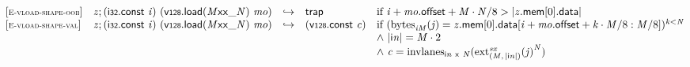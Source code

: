 \vspace{1ex}

$$
\begin{array}{@{}l@{}lcl@{}l@{}}
{[\textsc{\scriptsize E{-}vload{-}shape{-}oob}]} \quad & {\mathit{z}} ; (\mathsf{i{\scriptstyle32}}.\mathsf{const}~{\mathit{i}})~({\mathsf{v{\scriptstyle128}.load}}{({{{{{\mathit{M}}}{\mathsf{x}}}{\mathsf{x}}}{\mathsf{\_}}}{{\mathit{N}}})}~{\mathit{mo}}) &\hookrightarrow& \mathsf{trap} &\quad
  \mbox{if}~{\mathit{i}} + {\mathit{mo}}.\mathsf{offset} + {\mathit{M}} \cdot {\mathit{N}} / 8 > {|{{\mathit{z}}.\mathsf{mem}}{{}[0]}.\mathsf{data}|} \\
{[\textsc{\scriptsize E{-}vload{-}shape{-}val}]} \quad & {\mathit{z}} ; (\mathsf{i{\scriptstyle32}}.\mathsf{const}~{\mathit{i}})~({\mathsf{v{\scriptstyle128}.load}}{({{{{{\mathit{M}}}{\mathsf{x}}}{\mathsf{x}}}{\mathsf{\_}}}{{\mathit{N}}})}~{\mathit{mo}}) &\hookrightarrow& (\mathsf{v{\scriptstyle128}}.\mathsf{const}~{\mathit{c}}) &\quad
  \mbox{if}~({{\mathrm{bytes}}}_{{{\mathit{i}}}{{\mathit{M}}}}({\mathit{j}}) = {{\mathit{z}}.\mathsf{mem}}{{}[0]}.\mathsf{data}{}[{\mathit{i}} + {\mathit{mo}}.\mathsf{offset} + {\mathit{k}} \cdot {\mathit{M}} / 8 : {\mathit{M}} / 8])^{{\mathit{k}}<{\mathit{N}}} \\
 &&&&\quad {\land}~{|{\mathsf{i}}{{\mathit{n}}}|} = {\mathit{M}} \cdot 2 \\
 &&&&\quad {\land}~{\mathit{c}} = {{\mathrm{invlanes}}}_{{\mathsf{i}}{{\mathit{n}}}~\mathsf{x}~{\mathit{N}}}({{{{{\mathrm{ext}}}_{({\mathit{M}},\, {|{\mathsf{i}}{{\mathit{n}}}|})}^{{\mathit{sx}}}}}{({\mathit{j}})}^{{\mathit{N}}}}) \\
\end{array}
$$

\vspace{1ex}

